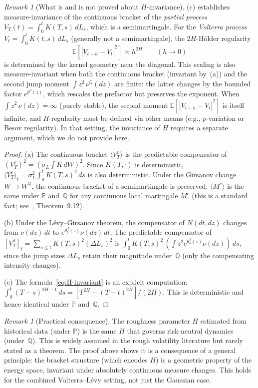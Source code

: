 \documentclass[11pt,a4paper]{article}
\theoremstyle{plain}
\theoremstyle{definition}
\theoremstyle{remark}
\newtheorem{remark}[theorem]{Remark}
\newcommand{\E}{\mathbb{E}}
\newcommand{\PP}{\mathbb{P}}
\newcommand{\QQ}{\mathbb{Q}}
\begin{document}
\begin{remark}[What is and is not proved about $H$-invariance]
\label{rem:H-scope}
(c) establishes measure-invariance
of the continuous bracket of the \emph{partial process}
$V_T(t) = \int_0^t K(T,s)\,dL_s$, which is a semimartingale.
For the \emph{Volterra process} $V_t = \int_0^t K(t,s)\,dL_s$
(generally not a semimartingale), the $2H$-H\"older regularity
\[
  \E[|V_{t+h} - V_t|^2] \asymp h^{2H}
  \qquad (h \to 0)
\]
is determined by the kernel geometry near the diagonal.
This scaling is also measure-invariant when both the
continuous bracket (invariant by~(a)) and the second
jump moment $\int z^2\,\nu^\QQ(dz)$ are finite: the
latter changes by the bounded factor $e^{\theta^J(z)}$,
which rescales the prefactor but preserves the exponent.
When $\int z^2\,\nu(dz) = \infty$ (purely stable), the
second moment $\E[|V_{t+h} - V_t|^2]$ is itself infinite,
and $H$-regularity must be defined via other means (e.g.,
$p$-variation or Besov regularity).  In that setting, the
invariance of $H$ requires a separate argument, which we
do not provide here.
\end{remark}

\begin{proof}
(a) The continuous bracket $\langle V_T^c \rangle$ is the
predictable compensator of $(V_T^c)^2 = (\sigma_L\int K\,dW)^2$.
Since $K(T,\cdot)$ is deterministic, $\langle V_T^c \rangle_t
= \sigma_L^2\int_0^t K(T,s)^2\,ds$ is also deterministic.
Under the Girsanov change $W \to W^\QQ$, the continuous
bracket of a semimartingale is preserved: $\langle M^c \rangle$
is the same under $\PP$ and~$\QQ$ for any continuous
local martingale $M^c$ (this is a standard fact;
see~\cite{ContTankov2004}, Theorem~9.12).

(b) Under the L\'evy--Girsanov theorem, the compensator of
$N(dt,dz)$ changes from $\nu(dz)\,dt$ to
$e^{\theta_t^J(z)}\nu(dz)\,dt$.  The
predictable compensator of $[V_T^d]_t = \sum_{s \leq t}
K(T,s)^2(\Delta L_s)^2$ is
$\int_0^t K(T,s)^2\,(\int z^2 e^{\theta_s^J(z)}\nu(dz))\,ds$,
since the jump sizes $\Delta L_s$ retain their magnitude
under~$\QQ$ (only the compensating intensity changes).

(c) The formula~\eqref{eq:H-invariant} is an explicit computation:
$\int_0^t(T-s)^{2H-1}\,ds = [T^{2H} - (T-t)^{2H}]/(2H)$.
This is deterministic and hence identical under $\PP$
and~$\QQ$.
\end{proof}

\begin{remark}[Practical consequence]\label{rem:H-calibration}
The roughness parameter $H$ estimated from historical data
(under $\PP$) is the same $H$ that governs risk-neutral dynamics
(under~$\QQ$).  This is widely assumed in the rough volatility
literature but rarely stated as a theorem.  The proof above
shows it is a consequence of a general principle: the bracket
structure (which encodes $H$) is a geometric property of the
energy space, invariant under absolutely continuous measure
changes.  This holds for the combined Volterra--L\'evy setting,
not just the Gaussian case.
\end{remark}
\end{document}
